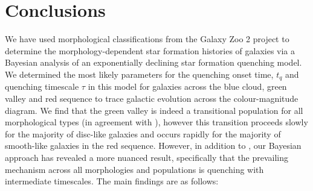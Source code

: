 \section{Conclusions}\label{morph:conc}
We have used morphological classifications from the Galaxy Zoo 2 project to determine the morphology-dependent star formation histories of galaxies via a Bayesian analysis of an exponentially declining star formation quenching model. We determined the most likely parameters for the quenching onset time, $t_q$ and quenching timescale $\tau$ in this model for galaxies across the blue cloud, green valley and red sequence to trace galactic evolution across the colour-magnitude diagram. We find that the green valley is indeed a transitional population for all morphological types (in agreement with \citet{schawinski14}), however this transition proceeds slowly for the majority of disc-like galaxies and occurs rapidly for the majority of smooth-like galaxies in the red sequence. However, in addition to \citet{schawinski14}, our Bayesian approach has revealed a more nuanced result, specifically that the prevailing mechanism across all morphologies and populations is quenching with intermediate timescales. The main findings are as follows:
